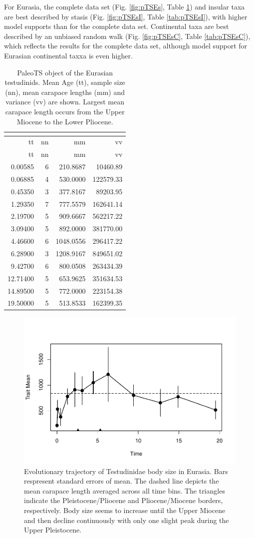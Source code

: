 For Eurasia, the complete data set (Fig. \ref{fig:pTSEs}, Table \ref{tab:pTSEus}) and insular taxa are best described by stasis (Fig. \ref{fig:pTSEsI}, Table \ref{tab:pTSEsI}), with higher model supports than for the complete data set. Continental taxa are best described by an unbiased random walk (Fig. \ref{fig:pTSEsC}, Table \ref{tab:pTSEsC}), which reflects the results for the complete data set, although model support for Eurasian continental taxxa is even higher.


\begin{longtable}[]{@{}rrrr@{}}
	\caption[PaleoTS object of Eurasian \T]{PaleoTS object of the Eurasian testudinids. Mean Age (tt), sample size (nn), mean carapace lengths (mm) and variance (vv) are shown. Largest mean carapace length occurs from the Upper Miocene to the Lower Pliocene.}
	
	\label{tab:pTSEs}\tabularnewline
	\toprule
	tt & nn & mm & vv\tabularnewline
	\midrule
	\endfirsthead
	\toprule
	tt & nn & mm & vv\tabularnewline
	\midrule
	\endhead
	0.00585 & 6 & 210.8687 & 10460.89\tabularnewline
	0.06885 & 4 & 530.0000 & 122579.33\tabularnewline
	0.45350 & 3 & 377.8167 & 89203.95\tabularnewline
	1.29350 & 7 & 777.5579 & 162641.14\tabularnewline
	2.19700 & 5 & 909.6667 & 562217.22\tabularnewline
	3.09400 & 5 & 892.0000 & 381770.00\tabularnewline
	4.46600 & 6 & 1048.0556 & 296417.22\tabularnewline
	6.28900 & 3 & 1208.9167 & 849651.02\tabularnewline
	9.42700 & 6 & 800.0508 & 263434.39\tabularnewline
	12.71400 & 5 & 653.9625 & 351634.53\tabularnewline
	14.89500 & 5 & 772.0000 & 223154.38\tabularnewline
	19.50000 & 5 & 513.8533 & 162399.35\tabularnewline
	\bottomrule
\end{longtable}


\begin{figure}[H]
	\centering
	\includegraphics{MA_JJ_files/figure-latex/paleoTSEurasia-1.pdf}
	\caption[PaleoTS plot of Eurasian \T]{Evolutionary trajectory of Testudinidae body size in Eurasia. Bars respresent standard errors of mean. The dashed line depicts the mean carapace length averaged across all time bins. The triangles indicate the Pleistocene/Pliocene and Pliocene/Miocene borders, respectively. Body size seems to increase until the Upper Miocene and then decline continuously with only one slight peak during the Upper Pleistocene.}
	\label{tab:pTSEus}
\end{figure}

